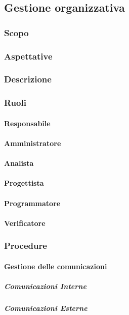 \documentclass[../norme-di-progetto.tex]{subfiles}
\begin{document}
\subsection{Gestione organizzativa}
\subsubsection{Scopo}

\subsubsection{Aspettative}

\subsubsection{Descrizione}

\subsubsection{Ruoli}
\paragraph{Responsabile}
\paragraph{Amministratore}
\paragraph{Analista}
\paragraph{Progettista}
\paragraph{Programmatore}
\paragraph{Verificatore}

\subsubsection{Procedure}
\paragraph{Gestione delle comunicazioni}
\subparagraph{Comunicazioni Interne}
\subparagraph{Comunicazioni Esterne}
\end{document}

